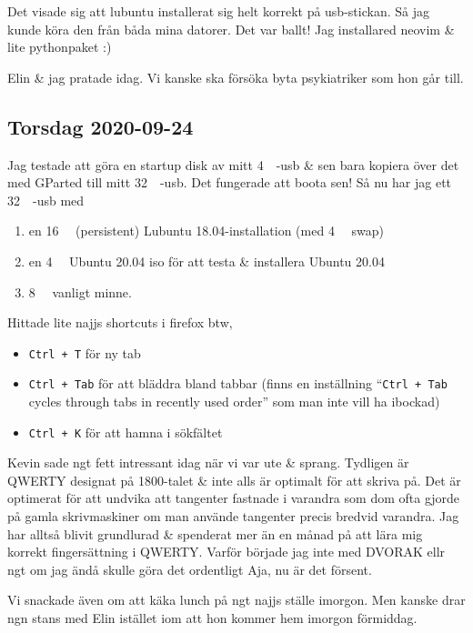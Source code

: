 Det visade sig att lubuntu installerat sig helt korrekt på usb-stickan. Så jag kunde köra den från båda mina datorer. Det var ballt! Jag installared neovim \& lite pythonpaket :)

\bigskip

Elin \& jag pratade idag. Vi kanske ska försöka byta psykiatriker som hon går till.


\subsection{Torsdag 2020-09-24}

Jag testade att göra en startup disk av mitt \SI{4}{\giga \byte}-usb \& sen bara kopiera över det med GParted till mitt \SI{32}{\giga \byte}-usb. Det fungerade att boota sen! Så nu har jag ett \SI{32}{\giga \byte}-usb med
\begin{enumerate}
	\item en \SI{16}{\giga \byte} (persistent) Lubuntu 18.04-installation (med \SI{4}{\giga \byte} swap)
	\item en \SI{4}{\giga \byte} Ubuntu 20.04 iso för att testa \& installera Ubuntu 20.04
	\item \SI{8}{\giga \byte} vanligt minne.
\end{enumerate}

Hittade lite najjs shortcuts i firefox btw,
\begin{itemize}
	\item \verb|Ctrl + T| för ny tab
	\item \verb|Ctrl + Tab| för att bläddra bland tabbar (finns en inställning \enquote{\texttt{Ctrl + Tab} cycles through tabs in recently used order} som man inte vill ha ibockad) %
	\item \verb|Ctrl + K| för att hamna i sökfältet
\end{itemize}

Kevin sade ngt fett intressant idag när vi var ute \& sprang. Tydligen är QWERTY designat på 1800-talet \& inte alls är optimalt för att skriva på. Det är optimerat för att undvika att tangenter fastnade i varandra som dom ofta gjorde på gamla skrivmaskiner om man använde tangenter precis bredvid varandra. Jag har alltså blivit grundlurad \& spenderat mer än en månad på att lära mig korrekt fingersättning i QWERTY. Varför började jag inte med DVORAK ellr ngt om jag ändå skulle göra det ordentligt{\textinterrobang} Aja, nu är det försent.

Vi snackade även om att käka lunch på ngt najjs ställe imorgon. Men kanske drar ngn stans med Elin istället iom att hon kommer hem imorgon förmiddag.


